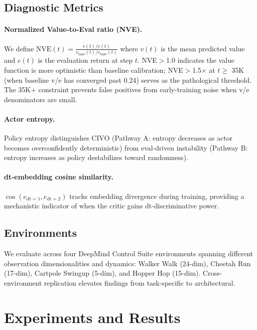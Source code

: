\documentclass[10pt,letterpaper]{article}
\begin{document}
\subsection{Diagnostic Metrics}

\paragraph{Normalized Value-to-Eval ratio (NVE).}
We define $\text{NVE}(t) = \frac{v(t)/e(t)}{v_{\text{base}}(t)/e_{\text{base}}(t)}$ where $v(t)$ is the mean predicted value and $e(t)$ is the evaluation return at step $t$.
NVE$>$1.0 indicates the value function is more optimistic than baseline calibration; NVE$>$1.5$\times$ at $t \geq$ 35K (when baseline v/e has converged past 0.24) serves as the pathological threshold.
The 35K+ constraint prevents false positives from early-training noise when v/e denominators are small.

\paragraph{Actor entropy.}
Policy entropy distinguishes CIVO (Pathway A: entropy decreases as actor becomes overconfidently deterministic) from eval-driven instability (Pathway B: entropy increases as policy destabilizes toward randomness).

\paragraph{dt-embedding cosine similarity.}
$\cos(e_{\text{dt}=1}, e_{\text{dt}=2})$ tracks embedding divergence during training, providing a mechanistic indicator of when the critic gains dt-discriminative power.

\subsection{Environments}

We evaluate across four DeepMind Control Suite environments spanning different observation dimensionalities and dynamics:
Walker Walk (24-dim), Cheetah Run (17-dim), Cartpole Swingup (5-dim), and Hopper Hop (15-dim).
Cross-environment replication elevates findings from task-specific to architectural.

\section{Experiments and Results}
\end{document}
